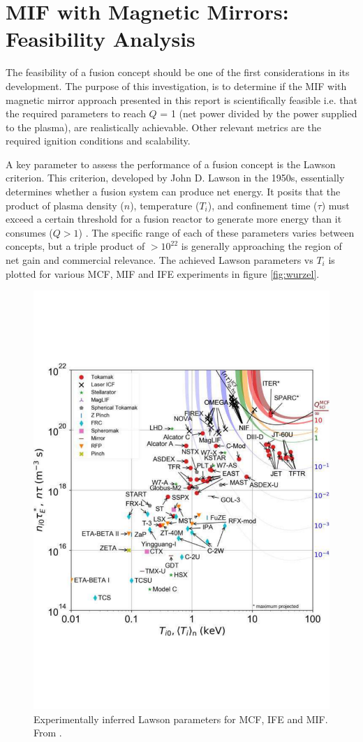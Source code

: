 \section{MIF with Magnetic Mirrors: Feasibility Analysis}

The feasibility of a fusion concept should be one of the first considerations in its development. The purpose of this investigation, is to determine if the MIF with magnetic mirror approach presented in this report is scientifically feasible i.e. that the required parameters to reach $Q$ = 1 (net power divided by the power supplied to the plasma), are realistically achievable. Other relevant metrics are the required ignition conditions and scalability.

A key parameter to assess the performance of a fusion concept is the Lawson criterion. This criterion, developed by John D. Lawson in the 1950s, essentially determines whether a fusion system can produce net energy. It posits that the product of plasma density ($n$), temperature ($T_i$), and confinement time ($\tau$) must exceed a certain threshold for a fusion reactor to generate more energy than it consumes ($Q > 1$) \cite{mills1971lawson}. The specific range of each of these parameters varies between concepts, but a triple product of $>10^{22}$ is generally approaching the region of net gain and commercial relevance. The achieved Lawson parameters vs $T_i$ is plotted for various MCF, MIF and IFE experiments in figure \ref{fig:wurzel}.

\begin{figure}[h!]
    \centering
    \includegraphics[width=0.8\linewidth]{SubreportFigures/wurzel_fusion_nttau.pdf}
    \caption{Experimentally inferred Lawson parameters for MCF, IFE and MIF. From \cite{wurzel2022progress}.}
    \label{fig:enter-label}
\end{figure}


